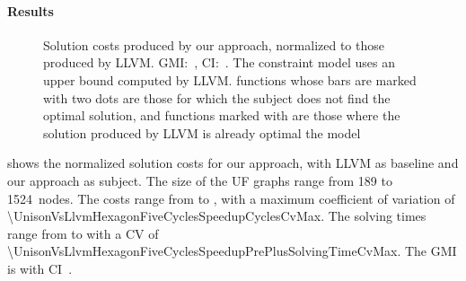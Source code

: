 \paragraph{Results}



\begin{figure}
  \centering%
  \maxsizebox{\textwidth}{!}{%
    \trimBarchartPlot{%
    }%
  }

  \caption[Plot for evaluating the impact of our approach on code quality]%
          {%
            Solution costs produced by our approach, normalized to those
            produced by LLVM.
            GMI:~\printGMI{%
              \UnisonVsLlvmHexagonFiveCyclesSpeedupCyclesRegularSpeedupGmean%
            },
            CI:~\printGMICI{%
              \UnisonVsLlvmHexagonFiveCyclesSpeedupCyclesRegularSpeedupCiMin%
            }{%
              \UnisonVsLlvmHexagonFiveCyclesSpeedupCyclesRegularSpeedupCiMax%
            }.
            The constraint model uses an upper bound computed by LLVM.
            \Glspl{function} whose bars are marked with two dots are those for
            which the \gls{subject} does not find the optimal solution, and
            \glspl{function} marked with \barValueNoSolution{} are those where
            the solution produced by \gls{LLVM} is already optimal \wrt the
            model%
          }
\end{figure}

 shows the normalized \gls{solution} costs
for our approach, with \gls{LLVM} as \gls{baseline} and our approach as
\gls{subject}.
%
The size of the \glspl{UF graph} range from \num{189} to
\num{1524}~\glspl{node}.
%
The costs range from
\printCycles{\UnisonVsLlvmHexagonFiveCyclesSpeedupCyclesAvgMin} to
\printCycles{\UnisonVsLlvmHexagonFiveCyclesSpeedupCyclesAvgMax}, with a maximum
coefficient of variation of
\num{\UnisonVsLlvmHexagonFiveCyclesSpeedupCyclesCvMax}.
%
The solving times range from
\printSolvingTime{\UnisonVsLlvmHexagonFiveCyclesSpeedupPrePlusSolvingTimeAvgMin}
to
\printSolvingTime{\UnisonVsLlvmHexagonFiveCyclesSpeedupPrePlusSolvingTimeAvgMax}
with a \gls{CV} of
\num{\UnisonVsLlvmHexagonFiveCyclesSpeedupPrePlusSolvingTimeCvMax}.
%
The \gls{GMI} is \printGMI{%
  \UnisonVsLlvmHexagonFiveCyclesSpeedupCyclesRegularSpeedupGmean%
} with \gls{CI}~\printGMICI{%
  \UnisonVsLlvmHexagonFiveCyclesSpeedupCyclesRegularSpeedupCiMin%
}{%
  \UnisonVsLlvmHexagonFiveCyclesSpeedupCyclesRegularSpeedupCiMax%
}.

